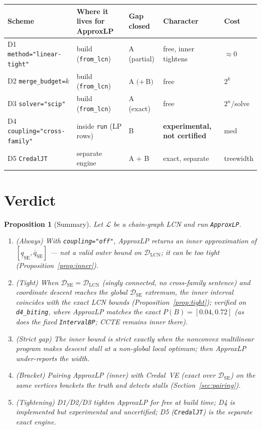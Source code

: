 \documentclass[11pt]{article}
\newtheorem{proposition}{Proposition}
\newcommand{\lo}{\underline}
\newcommand{\hi}{\overline}
\newcommand{\DSE}{\mathcal{D}_{\mathrm{SE}}}
\newcommand{\DLCN}{\mathcal{D}_{\mathrm{LCN}}}
\newcommand{\ALP}{\texttt{ApproxLP}}
\begin{document}
\begin{center}\small
\begin{tabular}{lllll}
\toprule
Scheme & Where it lives for ApproxLP & Gap closed & Character & Cost \\
\midrule
D1 \texttt{method="linear-tight"} & build (\texttt{from\_lcn}) & A (partial) & free, inner tightens & $\approx 0$ \\
D2 \texttt{merge\_budget=$k$}     & build (\texttt{from\_lcn}) & A $(+\,$B$)$ & free & $2^k$ \\
D3 \texttt{solver="scip"}         & build (\texttt{from\_lcn}) & A (exact)   & free & $2^n$/solve \\
D4 \texttt{coupling="cross-family"} & inside \texttt{run} (LP rows) & B & \textbf{experimental, not certified} & med \\
D5 \texttt{CredalJT}              & separate engine            & A $+$ B     & exact, separate & treewidth \\
\bottomrule
\end{tabular}
\end{center}

\section{Verdict}\label{sec:verdict}

\begin{proposition}[Summary]\label{prop:verdict}
Let $\mathcal L$ be a chain-graph LCN and run \ALP{}.
\begin{enumerate}
  \item (\emph{Always}) With \texttt{coupling="off"}, ApproxLP returns an \emph{inner} approximation
    of $[\lo q_{\mathrm{SE}},\hi q_{\mathrm{SE}}]$ --- \emph{not} a valid outer bound on $\DLCN$; it
    can be too tight (Proposition~\ref{prop:inner}).
  \item (\emph{Tight}) When $\DSE=\DLCN$ (singly connected, no cross-family sentence) and coordinate
    descent reaches the global $\DSE$ extremum, the inner interval coincides with the exact LCN
    bounds (Proposition~\ref{prop:tight}); verified on \texttt{d4\_biting}, where ApproxLP matches the
    exact $P(B)=[0.04,0.72]$ (as does the fixed \texttt{IntervalBP}; CCTE remains inner there).
  \item (\emph{Strict gap}) The inner bound is strict exactly when the nonconvex multilinear program
    makes descent stall at a non-global local optimum; then ApproxLP under-reports the width.
  \item (\emph{Bracket}) Pairing ApproxLP (inner) with Credal~VE (exact over $\DSE$) on the same
    vertices brackets the truth and detects stalls (Section~\ref{sec:pairing}).
  \item (\emph{Tightening}) D1/D2/D3 tighten ApproxLP for free at build time; D4 is implemented but
    experimental and uncertified; D5 (\texttt{CredalJT}) is the separate exact engine.
\end{enumerate}
\end{proposition}
\end{document}
